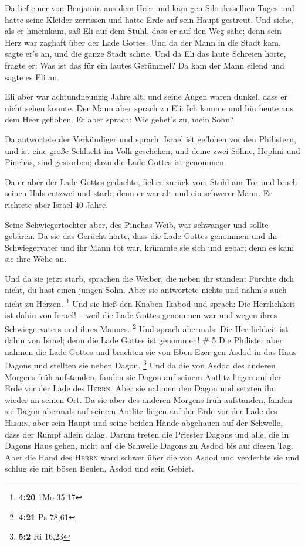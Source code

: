  Da lief einer von Benjamin aus dem Heer und kam gen Silo
desselben Tages und hatte seine Kleider zerrissen und hatte Erde auf
sein Haupt gestreut.  Und siehe, als er hineinkam, saß
Eli auf dem Stuhl, dass er auf den Weg sähe; denn sein Herz war zaghaft
über der Lade Gottes. Und da der Mann in die Stadt kam, sagte er's an,
und die ganze Stadt schrie.  Und da Eli das laute
Schreien hörte, fragte er: Was ist das für ein lautes Getümmel? Da kam
der Mann eilend und sagte es Eli an.

 Eli aber war achtundneunzig Jahre alt, und seine Augen
waren dunkel, dass er nicht sehen konnte.  Der Mann aber
sprach zu Eli: Ich komme und bin heute aus dem Heer geflohen. Er aber
sprach: Wie gehet's zu, mein Sohn?

 Da antwortete der Verkündiger und sprach: Israel ist
geflohen vor den Philistern, und ist eine große Schlacht im Volk
geschehen, und deine zwei Söhne, Hophni und Pinehas, sind gestorben;
dazu die Lade Gottes ist genommen.

 Da er aber der Lade Gottes gedachte, fiel er zurück vom
Stuhl am Tor und brach seinen Hals entzwei und starb; denn er war alt
und ein schwerer Mann. Er richtete aber Israel 40 Jahre.

 Seine Schwiegertochter aber, des Pinehas Weib, war
schwanger und sollte gebären. Da sie das Gerücht hörte, dass die Lade
Gottes genommen und ihr Schwiegervater und ihr Mann tot war, krümmte sie
sich und gebar; denn es kam sie ihre Wehe an.

 Und da sie jetzt starb, sprachen die Weiber, die neben
ihr standen: Fürchte dich nicht, du hast einen jungen Sohn. Aber sie
antwortete nichts und nahm's auch nicht zu Herzen. \footnote{\textbf{4:20}
  1Mo 35,17}  Und sie hieß den Knaben Ikabod und sprach:
Die Herrlichkeit ist dahin von Israel! -- weil die Lade Gottes genommen
war und wegen ihres Schwiegervaters und ihres Mannes. \footnote{\textbf{4:21}
  Ps 78,61}  Und sprach abermals: Die Herrlichkeit ist
dahin von Israel; denn die Lade Gottes ist genommen! \# 5 
Die Philister aber nahmen die Lade Gottes und brachten sie von Eben-Ezer
gen Asdod  in das Haus Dagons und stellten sie neben
Dagon. \footnote{\textbf{5:2} Ri 16,23}  Und da die von
Asdod des anderen Morgens früh aufstanden, fanden sie Dagon auf seinem
Antlitz liegen auf der Erde vor der Lade des \textsc{Herrn}. Aber sie
nahmen den Dagon und setzten ihn wieder an seinen Ort.  Da
sie aber des anderen Morgens früh aufstanden, fanden sie Dagon abermals
auf seinem Antlitz liegen auf der Erde vor der Lade des \textsc{Herrn},
aber sein Haupt und seine beiden Hände abgehauen auf der Schwelle, dass
der Rumpf allein dalag.  Darum treten die Priester Dagons
und alle, die in Dagons Haus gehen, nicht auf die Schwelle Dagons zu
Asdod bis auf diesen Tag.  Aber die Hand des
\textsc{Herrn} ward schwer über die von Asdod und verderbte sie und
schlug sie mit bösen Beulen, Asdod und sein Gebiet.

